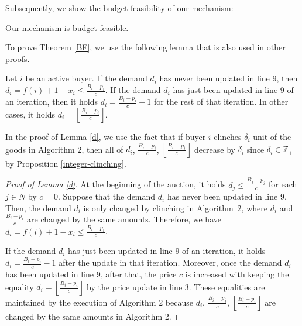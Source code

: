 \documentclass[letterpaper,11pt]{article}
\begin{document}
	Subsequently, we show the budget feasibility of our mechanism: 
	\begin{theorem}
	\label{BF}
	Our mechanism is budget feasible.
	\end{theorem}
	To prove Theorem \ref{BF}, we use the following lemma that is also used in other proofs.
	\begin{lemma}
	\label{d}
Let $i$ be an active buyer.
If the demand $d_i$ has never been updated in line 9, then $d_i=f(i)+1-x_i\leq \frac{B_i-p_i}{c}$. If the demand $d_i$ has just been updated in line 9 of an iteration, then it holds $d_i=\frac{B_i-p_i}{c}-1$ for the rest of that iteration. In other cases, it holds $d_i=\left\lfloor \frac{B_i-p_i}{c}\right\rfloor$.
	\end{lemma}
	In the proof of Lemma \ref{d}, we use the fact that if buyer $i$ clinches $\delta_i$ unit of the goods in Algorithm 2, then all of $d_i$, $\frac{B_{i}-p_{i}}{c}$, $\left\lfloor\frac{B_{i}-p_{i}}{c}\right\rfloor$ decrease by $\delta_i$ since $\delta_i\in \mathbb Z_{+}$ by Proposition \ref{integer-clinching}.	 
	\begin{proof}[Proof of Lemma \ref{d}]
	At the beginning of the auction, it holds $d_j\leq \frac{B_{j}-p_{j}}{c}$ for each $j\in N$ by $c=0$.
	Suppose that the demand $d_i$ has never been updated in line 9. 
	Then, the demand $d_i$ is only changed by clinching in Algorithm~2, 
	where $d_i$ and $\frac{B_{i}-p_{i}}{c}$ are changed by the same amounts. 
	Therefore, we have $d_i=f(i)+1-x_i\leq \frac{B_i-p_i}{c}$. 
	
	If the demand $d_i$ has just been updated in line 9 of an iteration, 
	it holds $d_i=\frac{B_{i}-p_{i}}{c}-1$ after the update in that iteration. 
	Moreover, once the demand $d_i$ has been updated in line 9, after that, 
	the price $c$ is increased with keeping the equality $d_i=\left\lfloor\frac{B_{i}-p_{i}}{c}\right\rfloor$ 
	by the price update in line 3. 
	These equalities are maintained by the execution of Algorithm 2 because 
	$d_i$, $\frac{B_{j}-p_{j}}{c}$, $\left\lfloor\frac{B_{i}-p_{i}}{c}\right\rfloor$ 
	are changed by the same amounts in Algorithm 2.
	
	\end{proof}
\end{document}
